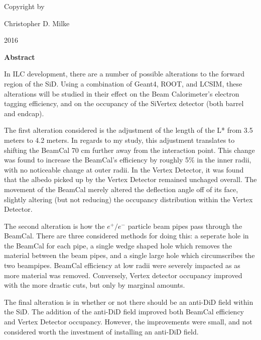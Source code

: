 \documentclass{report}
\begin{document}
    \newpage \begin{center} 
        \vspace*{\fill}
        Copyright \textcopyright by

        Christopher D. Milke 

        2016
        \vspace*{\fill}
    \end{center} \newpage


        \begin{center} \LARGE \textbf{Abstract} \end{center}

        In ILC development, there are a number of possible alterations to the forward region of the SiD. Using a combination of Geant4, ROOT, and LCSIM, these alterations will be studied in their effect on the Beam Calorimeter's electron tagging efficiency, and on the occupancy of the SiVertex detector (both barrel and endcap).

        The first alteration considered is the adjustment of the length of the L* from 3.5 meters to 4.2 meters. In regards to my study, this adjustment translates to shifting the BeamCal 70 cm further away from the interaction point. This change was found to increase the BeamCal's efficiency by roughly 5\% in the inner radii, with no noticeable change at outer radii. In the Vertex Detector, it was found that the albedo picked up by the Vertex Detector remained unchaged overall. The movement of the BeamCal merely altered the deflection angle off of its face, slightly altering (but not reducing) the occupancy distribution within the Vertex Detector.

        The second alteration is how the $e^+/e^-$ particle beam pipes pass through the BeamCal. There are three considered methods for doing this: a seperate hole in the BeamCal for each pipe, a single wedge shaped hole which removes the material between the beam pipes, and a single large hole which circumscribes the two beampipes. BeamCal efficiency at low radii were severely impacted as as more material was removed. Conversely, Vertex detector occupancy improved with the more drastic cuts, but only by marginal amounts.

        The final alteration is in whether or not there should be an anti-DiD field within the SiD. The addition of the anti-DiD field improved both BeamCal efficiency and Vertex Detector occupancy. However, the improvements were small, and not considered worth the investment of installing an anti-DiD field.
    \newpage
\end{document}
